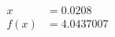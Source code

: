 \documentclass[preview]{standalone}
\begin{document}
\begin{align*}
x &= 0.0208\\f(x) &= 4.0437007
\end{align*}
\end{document}
